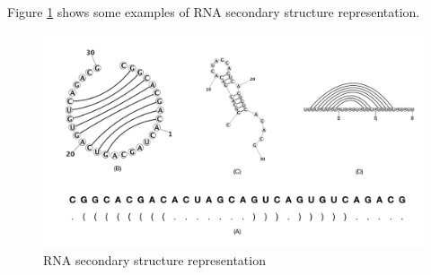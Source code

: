 Figure \ref{fig:representation} shows some examples of RNA secondary structure representation.
\begin{figure}
	\includegraphics[width=1.0 \linewidth]{../res/images/arnaque/intro/RNA_reps}
	\caption{RNA secondary structure representation}\label{fig:representation}
\end{figure}

